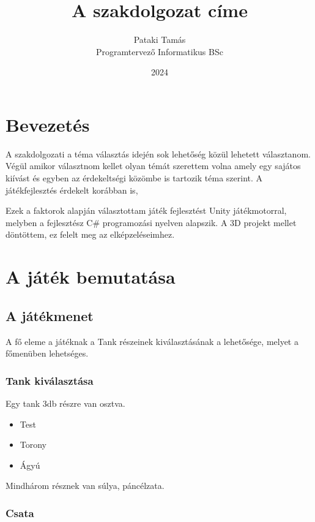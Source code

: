 \documentclass[
]{thesis-ekf}
\theoremstyle{definition}
\theoremstyle{remark}
\begin{document}
\title{A szakdolgozat címe}
\author{Pataki Tamás\\Programtervező Informatikus BSc}
\date{2024}
\maketitle

\tableofcontents

\chapter*{Bevezetés}
A szakdolgozati a téma választás idején sok lehetőség közül lehetett választanom.
Végül amikor választnom kellet olyan témát szerettem volna amely egy sajátos kiívást és egyben az érdekeltségi közömbe is tartozik téma szerint.
A játékfejlesztés érdekelt korábban is, 

Ezek a faktorok alapján választottam játék fejlesztést Unity\cite{Unity} játékmotorral, melyben a fejlesztész C\# programozási nyelven alapszik. A 3D projekt mellet döntöttem, ez felelt meg az elképzeléseimhez. 



\chapter{A játék bemutatása}


\section{A játékmenet}

A fő eleme a játéknak a Tank részeinek kiválasztásának a lehetősége, melyet a főmenüben lehetséges.
\subsection{Tank kiválasztása}

Egy tank 3db részre van osztva.
\begin{itemize}
    \item Test
    \item Torony
    \item Ágyú
\end{itemize}
Mindhárom résznek van súlya, páncélzata.

\subsection{Csata}
\end{document}
